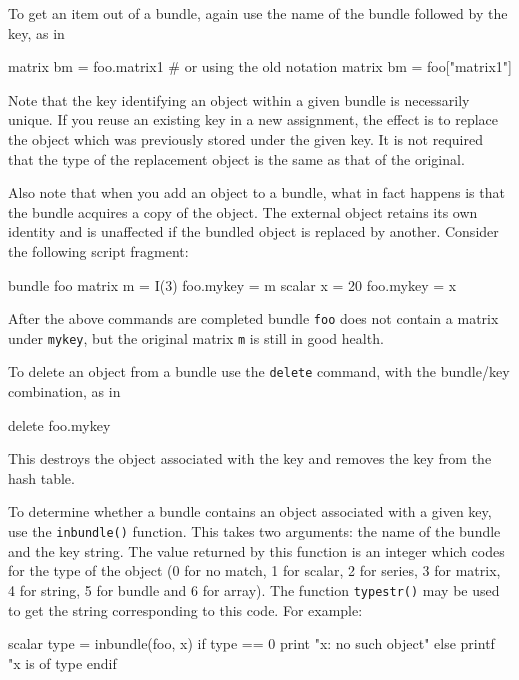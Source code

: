 To get an item out of a bundle, again use the name of the bundle
followed by the key, as in

\begin{code}
matrix bm = foo.matrix1
# or using the old notation
matrix bm = foo["matrix1"]
\end{code}

Note that the key identifying an object within a given bundle is
necessarily unique. If you reuse an existing key in a new assignment,
the effect is to replace the object which was previously stored under
the given key. It is not required that the type of the replacement
object is the same as that of the original.

Also note that when you add an object to a bundle, what in fact
happens is that the bundle acquires a copy of the object. The external
object retains its own identity and is unaffected if the bundled
object is replaced by another. Consider the following script fragment:

\begin{code}
bundle foo
matrix m = I(3)
foo.mykey = m
scalar x = 20
foo.mykey = x
\end{code}

After the above commands are completed bundle \texttt{foo} does not
contain a matrix under \texttt{mykey}, but the original matrix
\texttt{m} is still in good health.

To delete an object from a bundle use the \texttt{delete} command,
with the bundle/key combination, as in

\begin{code}
delete foo.mykey
\end{code}

This destroys the object associated with the key and removes the key
from the hash table.

To determine whether a bundle contains an object associated with a
given key, use the \texttt{inbundle()} function. This takes two
arguments: the name of the bundle and the key string. The value
returned by this function is an integer which codes for the type of
the object (0 for no match, 1 for scalar, 2 for series, 3 for matrix,
4 for string, 5 for bundle and 6 for array). The function
\texttt{typestr()} may be used to get the string corresponding to this
code. For example:

\begin{code}
scalar type = inbundle(foo, x)
if type == 0
  print "x: no such object"
else
  printf "x is of type %
endif
\end{code}

